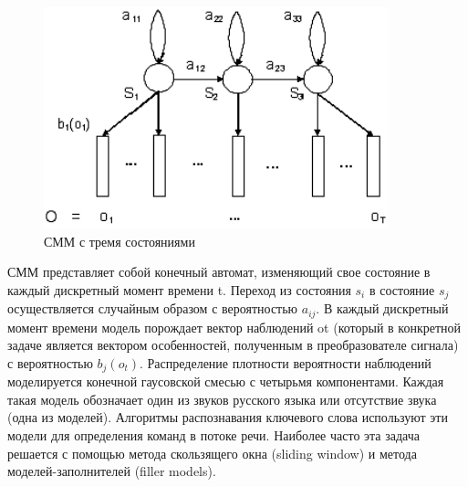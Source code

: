 \documentclass[a4paper,14pt,russian,utf8,nocolumnsxix,nocolumnxxxi,nocolumnxxxii]{eskdtext}
\begin{document}
\begin{figure}[h]	
	\centering
	\includegraphics[width=100mm]{smm_3.png}			
	\caption{СММ с тремя состояниями}
	\label{smm_3}
\end{figure}

СММ представляет собой конечный автомат, изменяющий свое состояние в каждый дискретный момент времени t. Переход из состояния $s_{i}$ в состояние $s_{j}$ осуществляется случайным образом с вероятностью $a_{ij}$. В каждый дискретный момент времени модель порождает вектор наблюдений ot (который в конкретной задаче является вектором особенностей, полученным в преобразователе сигнала) с вероятностью $b_{j}(o_{t})$. Распределение плотности вероятности наблюдений моделируется конечной гаусовской смесью с четырьмя компонентами. Каждая такая модель обозначает один из звуков русского языка или отсутствие звука (одна из моделей). Алгоритмы распознавания ключевого слова\cite{hazen} используют эти модели для определения команд в потоке речи. Наиболее часто эта задача решается с помощью метода скользящего окна (sliding window)\cite{bridle} и метода моделей-заполнителей (filler models)\cite{higgins}.
\end{document}
